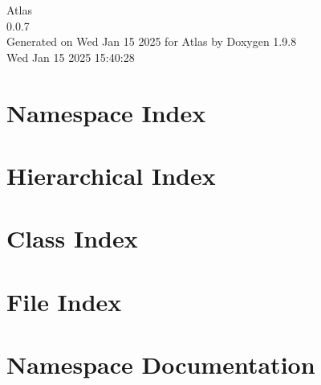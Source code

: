 \documentclass[twoside]{book}
\newcommand{\+}{\discretionary{\mbox{\scriptsize$\hookleftarrow$}}{}{}}
\newcommand{\clearemptydoublepage}{%
    \newpage{\pagestyle{empty}\cleardoublepage}%
  }
\begin{document}
  \raggedbottom
    \hypersetup{pageanchor=false,
                bookmarksnumbered=true,
                pdfencoding=unicode
               }
  \begin{titlepage}
  \vspace*{7cm}
  \begin{center}%
  {\Large Atlas}\\
  [1ex]\large 0.\+0.\+7 \\
  \vspace*{1cm}
  {\large Generated on Wed Jan 15 2025 for Atlas by Doxygen 1.9.8}\\
    \vspace*{0.5cm}
    {\small Wed Jan 15 2025 15:40:28}
  \end{center}
  \end{titlepage}
  \clearemptydoublepage
  \tableofcontents
  \clearemptydoublepage
  \hypersetup{pageanchor=true}





\chapter{Namespace Index}

\chapter{Hierarchical Index}

\chapter{Class Index}

\chapter{File Index}

\chapter{Namespace Documentation}












\end{document}
